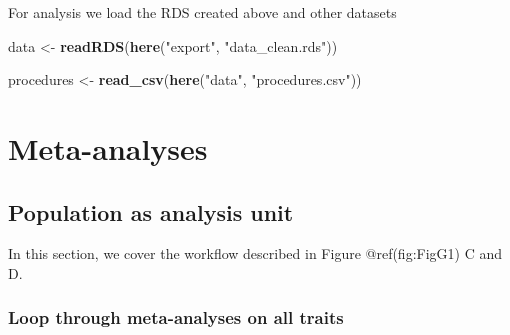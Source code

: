 \documentclass[]{article}
\newenvironment{Shaded}{\begin{snugshade}}{\end{snugshade}}
\newcommand{\CommentTok}[1]{\textcolor[rgb]{0.56,0.35,0.01}{\textit{#1}}}
\newcommand{\KeywordTok}[1]{\textcolor[rgb]{0.13,0.29,0.53}{\textbf{#1}}}
\newcommand{\NormalTok}[1]{#1}
\newcommand{\OperatorTok}[1]{\textcolor[rgb]{0.81,0.36,0.00}{\textbf{#1}}}
\newcommand{\StringTok}[1]{\textcolor[rgb]{0.31,0.60,0.02}{#1}}
\begin{document}
\begin{Shaded}
\end{Shaded}

For analysis we load the RDS created above and other datasets

\begin{Shaded}
\begin{Highlighting}[]
\NormalTok{data <-}\StringTok{ }\KeywordTok{readRDS}\NormalTok{(}\KeywordTok{here}\NormalTok{(}\StringTok{"export"}\NormalTok{, }\StringTok{"data_clean.rds"}\NormalTok{))}

\NormalTok{procedures <-}\StringTok{ }\KeywordTok{read_csv}\NormalTok{(}\KeywordTok{here}\NormalTok{(}\StringTok{"data"}\NormalTok{, }\StringTok{"procedures.csv"}\NormalTok{))}
\end{Highlighting}
\end{Shaded}

\hypertarget{meta-analyses}{%
\section{Meta-analyses}\label{meta-analyses}}

\hypertarget{population-as-analysis-unit}{%
\subsection{Population as analysis
unit}\label{population-as-analysis-unit}}

In this section, we cover the workflow described in Figure
@ref(fig:FigG1) C and D.

\hypertarget{loop-through-meta-analyses-on-all-traits}{%
\subsubsection{Loop through meta-analyses on all
traits}\label{loop-through-meta-analyses-on-all-traits}}
\end{document}
